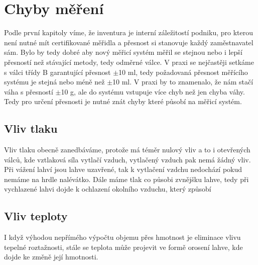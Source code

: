 

\section{Chyby měření}
Podle první kapitoly víme, že inventura je interní záležitostí podniku, pro kterou není nutné mít certifikované měřidla a přesnost si stanovuje každý zaměstnavatel sám. Bylo by tedy dobré aby nový měřicí systém měřil se stejnou nebo i lepší přesností než stávající metody, tedy odměrné válce. V praxi se nejčastěji setkáme s válci třídy B garantující přesnost $\pm$10 ml, tedy požadovaná přesnost měřícího systému je stejná nebo méně než $\pm$10 ml. V praxi by to znamenalo, že nám stačí váha s přesností $\pm$10 g, ale do systému vstupuje více chyb než jen chyba váhy.
Tedy pro určení přesnosti je nutné znát chyby které působí na měřicí systém.
\subsection{Vliv tlaku}
Vliv tlaku obecně zanedbáváme, protože má téměr nulový vliv a to i otevřených válců, kde vztlaková síla vytlačí vzduch, vytlačený vzduch pak nemá žádný vliv. Při vážení lahví jsou lahve uzavřené, tak k vytlačení vzdchu nedochází pokud nemáme na hrdle nalévátko. Dále máme tlak co působi zvnějšku lahve, tedy při vychlazené lahvi dojde k ochlazení okolního vzduchu, který způsobí 

\subsection{Vliv teploty}
\label{orosení}
I když výhodou nepřímého výpočtu objemu přes hmotnost je eliminace vlivu tepelné roztažnosti, stále se teplota může projevit ve formě orosení lahve, kde dojde ke změně její hmotnosti.

